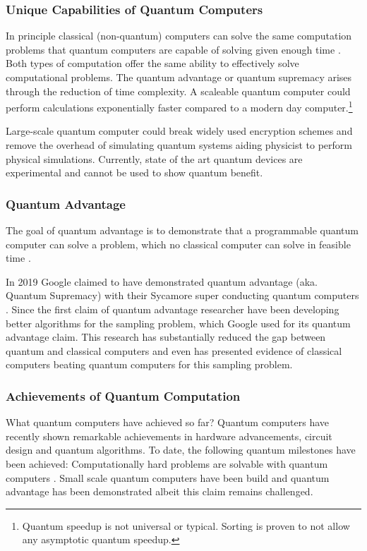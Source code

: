 \documentclass[11pt]{article}
\theoremstyle{definition}
\theoremstyle{definition}
\begin{document}
\subsubsection{Unique Capabilities of Quantum Computers}
\label{sec:orgc266e63}
In principle classical (non-quantum) computers can solve the same computation problems
that quantum computers are capable of solving given enough time \cite{preskill_quantum_2012}\cite{preskill_quantum_2018}.
Both types of computation offer the same ability to effectively solve computational problems.
The quantum advantage or quantum supremacy arises through the reduction of time complexity.
A scaleable quantum computer could perform calculations exponentially faster compared
to a modern day computer.\footnote{Quantum speedup is not universal or typical. Sorting is proven to not allow any asymptotic quantum speedup.}

Large-scale quantum computer could break widely used encryption schemes and remove the
overhead of simulating quantum systems aiding physicist to perform physical simulations.
Currently, state of the art quantum devices are experimental and cannot be used to show quantum benefit.

\subsubsection{Quantum Advantage}
\label{sec:orged71c8b}
The goal of quantum advantage is to demonstrate that a programmable quantum computer can solve
a problem, which no classical computer can solve in feasible time \cite{harrow_quantum_2017}.

In 2019 Google claimed to have demonstrated quantum advantage (aka.
Quantum Supremacy) with their Sycamore super conducting quantum
computers \cite{arute_quantum_2019}.
Since the first claim of quantum advantage researcher have been developing
better algorithms for the sampling problem, which Google used for its
quantum advantage claim. This research has substantially reduced the gap
between quantum and classical computers
\cite{bulmer_boundary_2022}\cite{yong_closing_2021} and even has
presented evidence of classical computers beating quantum computers
\cite{pan_solving_2022} for this sampling problem.

\subsubsection{Achievements of Quantum Computation}
\label{sec:org9d2d6ad}
What quantum computers have achieved so far?
Quantum computers have recently shown remarkable achievements in hardware advancements,
circuit design and quantum algorithms.
To date, the following quantum milestones have been achieved:
Computationally hard problems are solvable with quantum computers \cite{deutsch_quantum_1985}.
Small scale quantum computers have been build \cite{choi_ibm_2023} and
quantum advantage has been demonstrated albeit this claim remains challenged.
\end{document}

